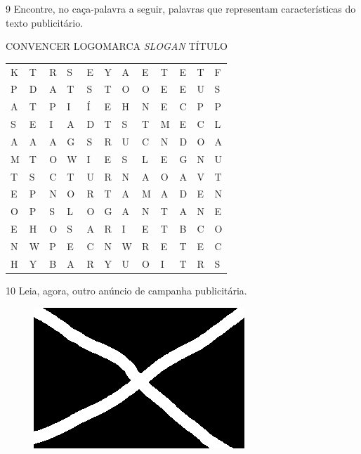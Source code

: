 \num{9} Encontre, no caça-palavra a seguir, palavras que representam
características do texto publicitário.

\begin{myquote}
CONVENCER \hfill LOGOMARCA \hfill \textit{SLOGAN} \hfill TÍTULO \hfill
\end{myquote}

\begin{center}
\begin{tabular}{llllllllllll}
K & T & R & S & E & Y & A & E & T & E & T & F\\
P & D & A & T & S & T & O & O & E & E & U & S\\
A & T & P & I & Í & E & H & N & E & C & P & P\\
S & E & I & A & D & T & S & T & M & E & C & L\\
A & A & A & G & S & R & U & C & N & D & O & A\\
M & T & O & W & I & E & S & L & E & G & N & U\\
T & S & C & T & U & R & N & A & O & A & V & T\\
E & P & N & O & R & T & A & M & A & D & E & N\\
O & P & S & L & O & G & A & N & T & A & N & E\\
E & H & O & S & A & R & I & E & T & B & C & O\\
N & W & P & E & C & N & W & R & E & T & E & C\\
H & Y & B & A & R & Y & U & O & I & T & R & S
\end{tabular}
\end{center}

\pagebreak
\num{10} Leia, agora, outro anúncio de campanha publicitária.

\begin{figure}[htpb!]
\includegraphics[width=\textwidth]{./media/confederados.png}
\end{figure}

